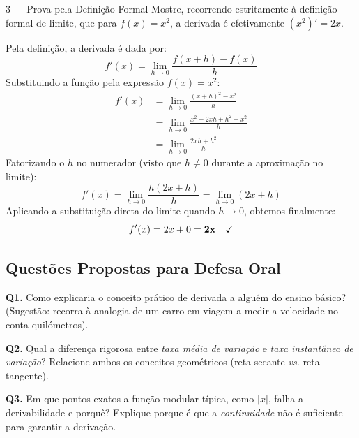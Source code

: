 \begin{exercisebox}{3 --- Prova pela Definição Formal}
  Mostre, recorrendo estritamente à definição formal de limite, que para $f(x) = x^2$, a derivada é efetivamente $(x^2)' = 2x$.
\end{exercisebox}
\begin{solbox}
  Pela definição, a derivada é dada por:
  \[
    f'(x) = \lim_{h\to 0} \frac{f(x+h)-f(x)}{h}
  \]
  Substituindo a função pela expressão $f(x) = x^2$:
  \begin{align*}
      f'(x) &= \lim_{h\to 0} \frac{(x+h)^2 - x^2}{h} \\
            &= \lim_{h\to 0} \frac{x^2 + 2xh + h^2 - x^2}{h} \\
            &= \lim_{h\to 0} \frac{2xh + h^2}{h}
  \end{align*}
  Fatorizando o $h$ no numerador (visto que $h \neq 0$ durante a aproximação no limite):
  \[
    f'(x) = \lim_{h\to 0} \frac{h(2x + h)}{h} = \lim_{h\to 0} (2x + h)
  \]
  Aplicando a substituição direta do limite quando $h \to 0$, obtemos finalmente:
  \[
    f'(x) = 2x + 0 = \mathbf{2x} \quad \text{\checkmark}
  \]
\end{solbox}

\subsection{Questões Propostas para Defesa Oral}

\begin{oralbox}
  \textbf{Q1.} Como explicaria o conceito prático de derivada a alguém do ensino básico? (Sugestão: recorra à analogia de um carro em viagem a medir a velocidade no conta-quilómetros).
\end{oralbox}

\begin{oralbox}
  \textbf{Q2.} Qual a diferença rigorosa entre \emph{taxa média de variação} e \emph{taxa instantânea de variação}? Relacione ambos os conceitos geométricos (reta secante \textit{vs.} reta tangente).
\end{oralbox}

\begin{oralbox}
  \textbf{Q3.} Em que pontos exatos a função modular típica, como $|x|$, falha a derivabilidade e porquê? Explique porque é que a \emph{continuidade} não é suficiente para garantir a derivação.
\end{oralbox}

